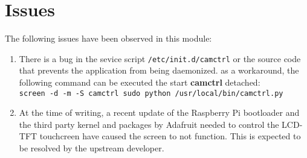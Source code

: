 \section{Issues}
The following issues have been observed in this module:
   \begin{enumerate}
      \item There is a bug in the sevice script \texttt{/etc/init.d/camctrl} or
         the source code that prevents the application from being daemonized. as
         a workaround, the following command can be executed the start
         \textbf{camctrl} detached:\\
         \texttt{screen -d -m -S camctrl sudo python /usr/local/bin/camctrl.py}
      \item At the time of writing, a recent update of the Raspberry Pi
         bootloader and the third party kernel and packages by Adafruit needed
         to control the LCD-TFT touchcreen have caused the screen to not
         function. This is expected to be resolved by the upstream developer.
   \end{enumerate}

